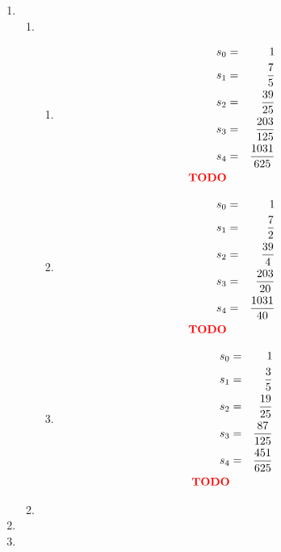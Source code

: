 \documentclass [a4paper,11pt]{article}
\begin{document}
\begin{enumerate}
\begin{enumerate}
\begin{align}
                        \Leftrightarrow \limp
                        \todo
                    \end{align}
            \end{enumerate}
        \item[\textbf{2.}]
            \begin{enumerate}
                \item[a)]
                    \begin{enumerate}
                        \item[(i)]
                            \begin{align}
                                s_0 &=& 1\\
                                s_1 &=& \frac{7}{5}\\
                                s_2 &=& \frac{39}{25}\\
                                s_3 &=& \frac{203}{125}\\
                                s_4 &=& \frac{1031}{625} \\
                                \textbf{\textcolor{red}{TODO}}
                            \end{align}
                        \item[(ii)]
                            \begin{align}
                                s_0 &=& 1\\
                                s_1 &=& \frac{7}{2}\\
                                s_2 &=& \frac{39}{4}\\
                                s_3 &=& \frac{203}{20}\\
                                s_4 &=& \frac{1031}{40} \\
                                \textbf{\textcolor{red}{TODO}}
                            \end{align}
                        \item[(iii)]
                            \begin{align}
                                s_0 &=& 1\\
                                s_1 &=& \frac{3}{5}\\
                                s_2 &=& \frac{19}{25}\\
                                s_3 &=& \frac{87}{125}\\
                                s_4 &=& \frac{451}{625} \\
                                \textbf{\textcolor{red}{TODO}}
                            \end{align}
                    \end{enumerate}
                \item[b)]
                \todo
            \end{enumerate}
        \item[\textbf{3.}]
            \todo
        \item[\textbf{4.}]
            \todo
    \end{enumerate}
\end{document}
